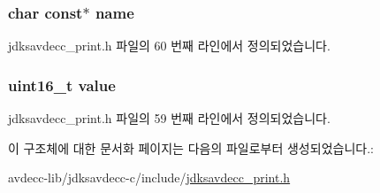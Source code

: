 \subsubsection[{\texorpdfstring{name}{name}}]{\setlength{\rightskip}{0pt plus 5cm}char const$\ast$ name}\hypertarget{structjdksavdecc__uint16__name_a5f1de76dd5d451949e12c0fbc966ca70}{}\label{structjdksavdecc__uint16__name_a5f1de76dd5d451949e12c0fbc966ca70}


jdksavdecc\+\_\+print.\+h 파일의 60 번째 라인에서 정의되었습니다.

\subsubsection[{\texorpdfstring{value}{value}}]{\setlength{\rightskip}{0pt plus 5cm}uint16\+\_\+t value}\hypertarget{structjdksavdecc__uint16__name_a900b69af7d674b8db3bceae754b4955a}{}\label{structjdksavdecc__uint16__name_a900b69af7d674b8db3bceae754b4955a}


jdksavdecc\+\_\+print.\+h 파일의 59 번째 라인에서 정의되었습니다.



이 구조체에 대한 문서화 페이지는 다음의 파일로부터 생성되었습니다.\+:\begin{DoxyCompactItemize}
\item 
avdecc-\/lib/jdksavdecc-\/c/include/\hyperlink{jdksavdecc__print_8h}{jdksavdecc\+\_\+print.\+h}\end{DoxyCompactItemize}
